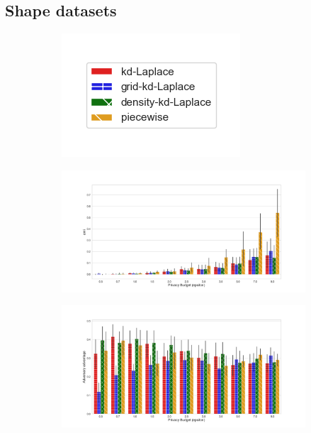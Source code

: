 \subsection{Shape datasets}

\begin{figure}[H]
      \centering
      \begin{subfigure}{0.30\textwidth}
            \includegraphics[width=\textwidth]{Results/kd-laplace/ami_bar_comparison_legend.png}
      \end{subfigure}
      \begin{subfigure}{1\textwidth}
            \includegraphics[width=1\textwidth]{Results/kd-laplace/ami_circle-dataset_comparison.png}
      \end{subfigure}
      \begin{subfigure}{1\textwidth}
            \includegraphics[width=1\textwidth]{Results/kd-laplace/shokri_mi_adv_circle-dataset_comparison.png}

\end{subfigure}
\end{figure}
